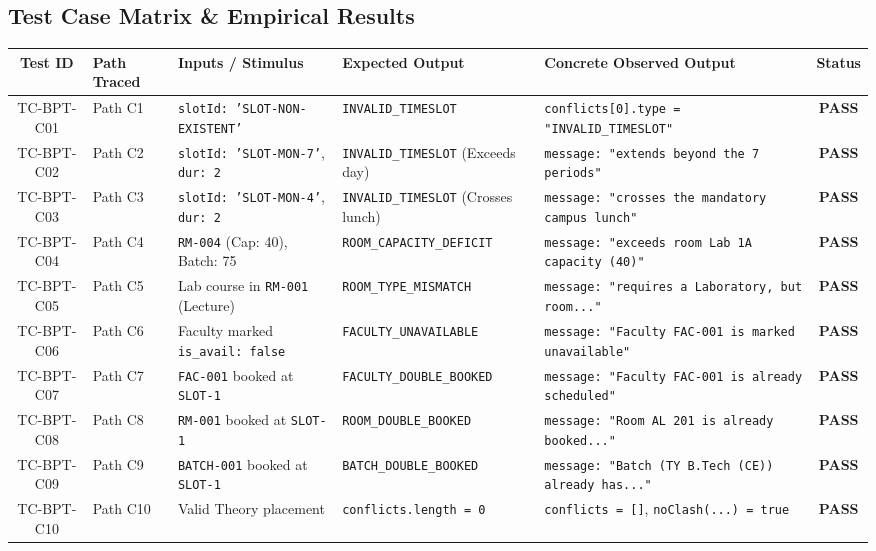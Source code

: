 \documentclass[11pt,a4paper]{article}
\begin{document}
\subsection{Test Case Matrix \& Empirical Results}
\begin{table}[H]
\centering
\scriptsize
\begin{tabular}{@{}clp{3.2cm}p{3.5cm}p{3.8cm}c@{}}
\toprule
\textbf{Test ID} & \textbf{Path Traced} & \textbf{Inputs / Stimulus} & \textbf{Expected Output} & \textbf{Concrete Observed Output} & \textbf{Status} \\ \midrule
TC-BPT-C01 & Path C1 & \texttt{slotId: 'SLOT-NON-EXISTENT'} & \texttt{INVALID\_TIMESLOT} & \texttt{conflicts[0].type = "INVALID\_TIMESLOT"} & \textbf{PASS} \\
TC-BPT-C02 & Path C2 & \texttt{slotId: 'SLOT-MON-7'}, \texttt{dur: 2} & \texttt{INVALID\_TIMESLOT} (Exceeds day) & \texttt{message: "extends beyond the 7 periods"} & \textbf{PASS} \\
TC-BPT-C03 & Path C3 & \texttt{slotId: 'SLOT-MON-4'}, \texttt{dur: 2} & \texttt{INVALID\_TIMESLOT} (Crosses lunch) & \texttt{message: "crosses the mandatory campus lunch"} & \textbf{PASS} \\
TC-BPT-C04 & Path C4 & \texttt{RM-004} (Cap: 40), Batch: 75 & \texttt{ROOM\_CAPACITY\_DEFICIT} & \texttt{message: "exceeds room Lab 1A capacity (40)"} & \textbf{PASS} \\
TC-BPT-C05 & Path C5 & Lab course in \texttt{RM-001} (Lecture) & \texttt{ROOM\_TYPE\_MISMATCH} & \texttt{message: "requires a Laboratory, but room..."} & \textbf{PASS} \\
TC-BPT-C06 & Path C6 & Faculty marked \texttt{is\_avail: false} & \texttt{FACULTY\_UNAVAILABLE} & \texttt{message: "Faculty FAC-001 is marked unavailable"} & \textbf{PASS} \\
TC-BPT-C07 & Path C7 & \texttt{FAC-001} booked at \texttt{SLOT-1} & \texttt{FACULTY\_DOUBLE\_BOOKED} & \texttt{message: "Faculty FAC-001 is already scheduled"} & \textbf{PASS} \\
TC-BPT-C08 & Path C8 & \texttt{RM-001} booked at \texttt{SLOT-1} & \texttt{ROOM\_DOUBLE\_BOOKED} & \texttt{message: "Room AL 201 is already booked..."} & \textbf{PASS} \\
TC-BPT-C09 & Path C9 & \texttt{BATCH-001} booked at \texttt{SLOT-1} & \texttt{BATCH\_DOUBLE\_BOOKED} & \texttt{message: "Batch (TY B.Tech (CE)) already has..."} & \textbf{PASS} \\
TC-BPT-C10 & Path C10 & Valid Theory placement & \texttt{conflicts.length = 0} & \texttt{conflicts = []}, \texttt{noClash(...) = true} & \textbf{PASS} \\

\end{tabular}
\end{table}
\end{document}
